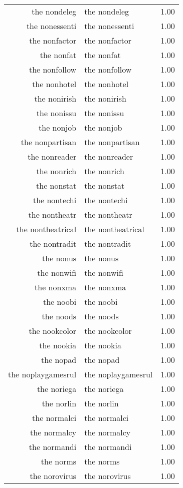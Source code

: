 \begin{table}[ht]
\begin{tabular}{rlr}
  the nondeleg & the nondeleg & 1.00 \\ 
  the nonessenti & the nonessenti & 1.00 \\ 
  the nonfactor & the nonfactor & 1.00 \\ 
  the nonfat & the nonfat & 1.00 \\ 
  the nonfollow & the nonfollow & 1.00 \\ 
  the nonhotel & the nonhotel & 1.00 \\ 
  the nonirish & the nonirish & 1.00 \\ 
  the nonissu & the nonissu & 1.00 \\ 
  the nonjob & the nonjob & 1.00 \\ 
  the nonpartisan & the nonpartisan & 1.00 \\ 
  the nonreader & the nonreader & 1.00 \\ 
  the nonrich & the nonrich & 1.00 \\ 
  the nonstat & the nonstat & 1.00 \\ 
  the nontechi & the nontechi & 1.00 \\ 
  the nontheatr & the nontheatr & 1.00 \\ 
  the nontheatrical & the nontheatrical & 1.00 \\ 
  the nontradit & the nontradit & 1.00 \\ 
  the nonus & the nonus & 1.00 \\ 
  the nonwifi & the nonwifi & 1.00 \\ 
  the nonxma & the nonxma & 1.00 \\ 
  the noobi & the noobi & 1.00 \\ 
  the noods & the noods & 1.00 \\ 
  the nookcolor & the nookcolor & 1.00 \\ 
  the nookia & the nookia & 1.00 \\ 
  the nopad & the nopad & 1.00 \\ 
  the noplaygamesrul & the noplaygamesrul & 1.00 \\ 
  the noriega & the noriega & 1.00 \\ 
  the norlin & the norlin & 1.00 \\ 
  the normalci & the normalci & 1.00 \\ 
  the normalcy & the normalcy & 1.00 \\ 
  the normandi & the normandi & 1.00 \\ 
  the norms & the norms & 1.00 \\ 
  the norovirus & the norovirus & 1.00 \\ 

\end{tabular}
\end{table}
